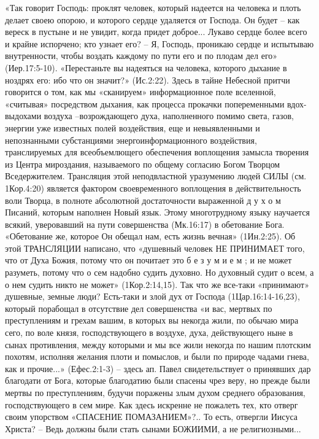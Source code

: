      «Так говорит Господь: проклят человек, который надеется на человека и плоть делает своею опорою, и которого сердце удаляется от Господа. Он будет – как вереск в пустыне и не увидит, когда придет доброе... Лукаво сердце более всего и крайне испорчено; кто узнает его? – Я, Господь, проникаю сердце и испытываю внутренности, чтобы воздать каждому по пути его и по плодам дел его» (Иер.17:5-10). «Перестаньте вы надеяться на человека, которого дыхание в ноздрях его: ибо что он значит?» (Ис.2:22).
     Здесь в тайне Небесной притчи говорится о том, как мы «сканируем» информационное поле вселенной, «считывая» посредством дыхания, как процесса прокачки попеременными вдох-выдохами воздуха –возрождающего духа, наполненного помимо света, газов, энергии уже известных полей воздействия, еще и невыявленными и непознанными субстанциями энергоинформационного воздействия, транслируемых для всеобъемлющего обеспечения воплощения замысла творения из Центра мироздания, называемого по общему согласию Богом Творцом Вседержителем.  Трансляция этой неподвластной уразумению людей СИЛЫ (см. 1Кор.4:20) является фактором своевременного воплощения в действительность воли Творца, в полноте абсолютной достаточности выраженной  д у х о м  Писаний, которым наполнен Новый язык. Этому многотрудному языку научается всякий, уверовавший на пути совершенства (Мк.16:17) в обетование Бога. «Обетование же, которое Он обещал нам, есть жизнь вечная» (1Ин.2:25).
     Об этой ТРАНСЛЯЦИИ написано, что «душевный человек  НЕ  ПРИНИМАЕТ  того, что от Духа Божия, потому что он почитает это  б е з у м и е м ; и не может разуметь, потому что о сем надобно судить духовно. Но духовный судит о всем, а о нем судить никто не может» (1Кор.2:14,15).
                Так что же все-таки «принимают» душевные, земные люди?
Есть-таки и злой дух от Господа (1Цар.16:14-16,23), который порабощал в отсутствие дел совершенства «и вас, мертвых по преступлениям и грехам вашим, в которых вы некогда жили, по обычаю мира сего, по воле князя, господствующего в воздухе, духа, действующего ныне в сынах противления, между которыми и мы все жили некогда по нашим плотским похотям, исполняя желания плоти и помыслов, и были по природе чадами гнева, как и прочие...» (Ефес.2:1-3) – здесь ап. Павел свидетельствует о принявших дар благодати от Бога, которые благодатию были спасены чрез веру, но прежде были мертвы по преступлениям, будучи поражены злым духом среднего образования, господствующего в сем мире.
     Как здесь искренне не пожалеть тех, кто отверг своим упорством  «СПАСЕНИЕ ПОМАЗАНИЕМ»?.. То есть, отвергли Иисуса Христа? – Ведь должны были стать сынами БОЖИИМИ, а не религиозными...
   
